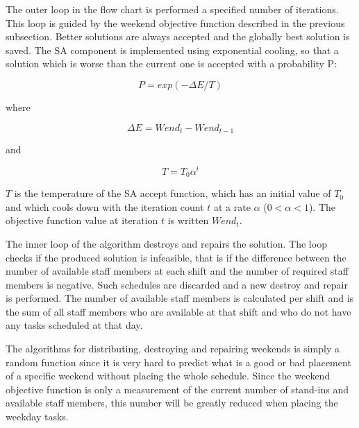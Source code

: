 The outer loop in the flow chart is performed a specified number of iterations. This loop is guided by the weekend objective function described in the previous subsection. Better solutions are always accepted and the globally best solution is saved. The SA component is implemented using exponential cooling, so that a solution which is worse than the current one is accepted with a probability P:

\begin{equation}
P = exp(-\Delta E/T)
\label{eq0}
\end{equation}

where

\begin{equation}
\Delta E = Wend_t - Wend_{t-1}
\label{eq1}
\end{equation}

and

\begin{equation}
T = T_0 \alpha^t
\label{eq2}
\end{equation}

$T$ is the temperature of the SA accept function, which has an initial value of $T_0$ and which cools down with the iteration count  $t$ at a rate $\alpha$ ($0 < \alpha < 1$). The objective function value at iteration $t$ is written $Wend_t$.


The inner loop of the algorithm destroys and repairs the solution. The loop checks if the produced solution is infeasible, that is if the difference between the number of available staff members at each shift and the number of required staff members is negative. Such schedules are discarded and a new destroy and repair is performed. The number of available staff members is calculated per shift and is the sum of all staff members who are available at that shift and who do not have any tasks scheduled at that day.

The algorithms for distributing, destroying and repairing weekends is simply a random function since it is very hard to predict what is a good or bad placement of a specific weekend without placing the whole schedule. Since the weekend objective function is only a measurement of the current number of stand-ins and available staff members, this number will be greatly reduced when placing the weekday tasks. 


